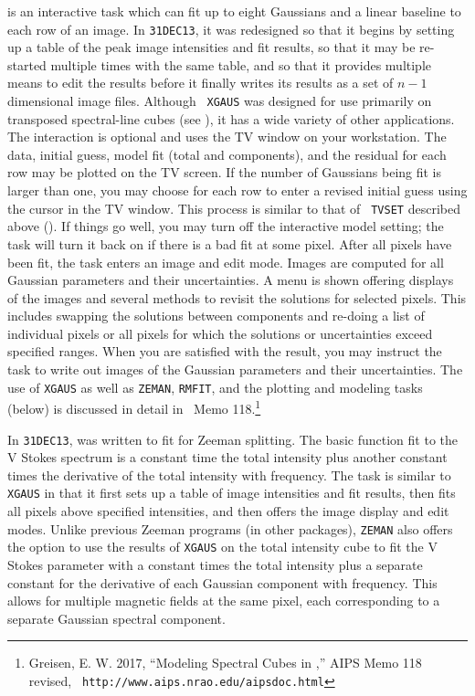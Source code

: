      {\tt {}} is an interactive task which can fit up to
eight Gaussians and a linear baseline to each row of an image.  In
{\tt 31DEC13}, it was redesigned so that it begins by setting up a
table of the peak image intensities and fit results, so that it may
be re-started multiple times with the same table, and so that it
provides multiple means to edit the results before it finally writes
its results as a set of $n-1$ dimensional image files.  Although {\tt
XGAUS} was designed for use primarily on transposed spectral-line
cubes (see ), it has a wide variety of other
applications.  The interaction is optional and uses the TV window on
your workstation.  The data, initial guess, model fit (total and
components), and the residual for each row may be plotted on the TV
screen.  If the number of Gaussians being fit is larger than one, you
may choose for each row to enter a revised initial guess using the
cursor in the TV window.  This process is similar to that of {\tt
TVSET} described above ().    If things go well, you may
turn off the interactive model setting; the task will turn it back on
if there is a bad fit at some pixel.  After all pixels have been fit,
the task enters an image and edit mode.  Images are computed for all
Gaussian parameters and their uncertainties.  A menu is shown offering
displays of the images and several methods to revisit the solutions
for selected pixels.  This includes swapping the solutions between
components and re-doing a list of individual pixels or all pixels for
which the solutions or uncertainties exceed specified ranges.  When
you are satisfied with the result, you may instruct the task to write
out images of the Gaussian parameters and their uncertainties.  The
use of {\tt XGAUS} as well as {\tt ZEMAN}, {\tt RMFIT}, and the
plotting and modeling tasks (below) is discussed in detail in \AIPS\
Memo 118.\footnote{Greisen, E. W. 2017, ``Modeling Spectral Cubes in
\AIPS,'' AIPS Memo 118 revised, {\tt
http://www.aips.nrao.edu/aipsdoc.html}}

     In {\tt 31DEC13}, {\tt {}} was written to fit for
Zeeman splitting.  The basic function fit to the V Stokes spectrum is
a constant time the total intensity plus another constant times the
derivative of the total intensity with frequency.  The task is similar
to {\tt XGAUS} in that it first sets up a table of image intensities
and fit results, then fits all pixels above specified intensities, and
then offers the image display and edit modes.  Unlike previous Zeeman
programs (in other packages), {\tt ZEMAN} also offers the option to
use the results of {\tt XGAUS} on the total intensity cube to fit the
V Stokes parameter with a constant times the total intensity plus a
separate constant for the derivative of each Gaussian component with
frequency.  This allows for multiple magnetic fields at the same
pixel, each corresponding to a separate Gaussian spectral component.

